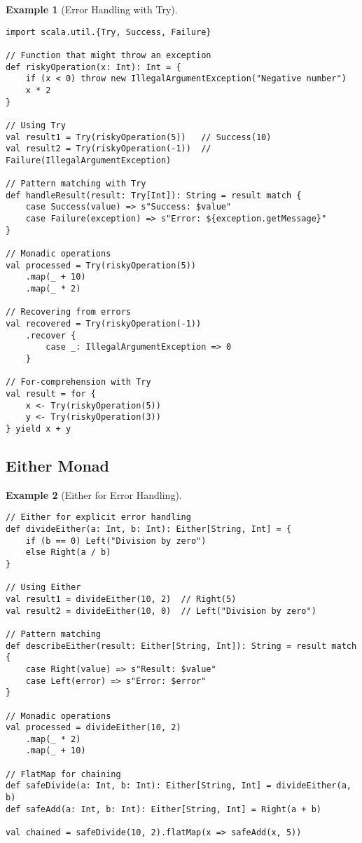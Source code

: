 \documentclass[11pt]{article}
\newtheorem{example}{Example}[section]
\begin{document}
\begin{example}[Error Handling with Try]
\begin{lstlisting}
import scala.util.{Try, Success, Failure}

// Function that might throw an exception
def riskyOperation(x: Int): Int = {
    if (x < 0) throw new IllegalArgumentException("Negative number")
    x * 2
}

// Using Try
val result1 = Try(riskyOperation(5))   // Success(10)
val result2 = Try(riskyOperation(-1))  // Failure(IllegalArgumentException)

// Pattern matching with Try
def handleResult(result: Try[Int]): String = result match {
    case Success(value) => s"Success: $value"
    case Failure(exception) => s"Error: ${exception.getMessage}"
}

// Monadic operations
val processed = Try(riskyOperation(5))
    .map(_ + 10)
    .map(_ * 2)

// Recovering from errors
val recovered = Try(riskyOperation(-1))
    .recover {
        case _: IllegalArgumentException => 0
    }

// For-comprehension with Try
val result = for {
    x <- Try(riskyOperation(5))
    y <- Try(riskyOperation(3))
} yield x + y
\end{lstlisting}
\end{example}

\subsection{Either Monad}

\begin{example}[Either for Error Handling]
\begin{lstlisting}
// Either for explicit error handling
def divideEither(a: Int, b: Int): Either[String, Int] = {
    if (b == 0) Left("Division by zero")
    else Right(a / b)
}

// Using Either
val result1 = divideEither(10, 2)  // Right(5)
val result2 = divideEither(10, 0)  // Left("Division by zero")

// Pattern matching
def describeEither(result: Either[String, Int]): String = result match {
    case Right(value) => s"Result: $value"
    case Left(error) => s"Error: $error"
}

// Monadic operations
val processed = divideEither(10, 2)
    .map(_ * 2)
    .map(_ + 10)

// FlatMap for chaining
def safeDivide(a: Int, b: Int): Either[String, Int] = divideEither(a, b)
def safeAdd(a: Int, b: Int): Either[String, Int] = Right(a + b)

val chained = safeDivide(10, 2).flatMap(x => safeAdd(x, 5))
\end{lstlisting}
\end{example}
\end{document}
